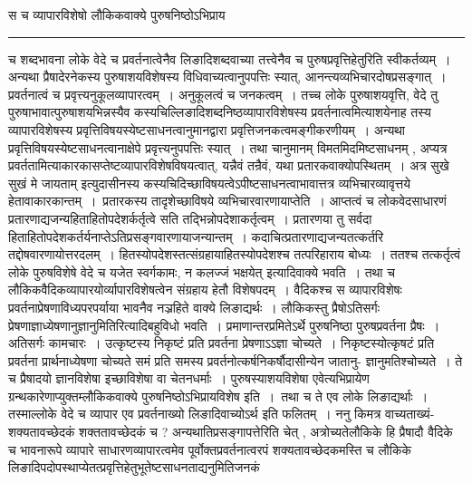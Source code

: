 \documentclass[11pt, openany]{book}
\begin{document}
{\bl स च व्यापारविशेषो लौकिकवाक्ये पुरुषनिष्ठोऽभिप्राय }\\
\hrule
\vspace{3mm}
\noindent
च शब्दभावना लोके वेदे च प्रवर्तनात्वेनैव लिङादिशब्दवाच्या तत्त्वेनैव च पुरुषप्रवृत्तिहेतुरिति स्वीकर्तव्यम्~। अन्यथा प्रैषादेरनेकस्य पुरुषाशयविशेषस्य विधिवाच्यत्वानुपपत्तिः स्यात्, आनन्त्यव्यभिचारदोषप्रसङ्गात्~। प्रवर्तनात्वं च प्रवृत्त्यनुकूलव्यापारत्वम्~। अनुकूलत्वं च जनकत्वम्~। तच्च लोके पुरुषाशयवृत्ति, वेदे तु पुरुषाभावात्पुरुषाशयभिन्नस्यैव कस्यचिल्लिङादिशब्दनिष्ठव्यापारविशेषस्य प्रवर्तनात्वमित्याशयेनाह  तस्य व्यापारविशेषस्य प्रवृत्तिविषयस्येष्टसाधनत्वानुमानद्वारा प्रवृत्तिजनकत्वमङ्गीकरणीयम्~। अन्यथा प्रवृत्तिविषयस्येष्टसाधनत्वानाक्षेपे प्रवृत्त्यनुपपत्तिः स्यात्~। तथा चानुमानम् {\qt विमतमिदमिष्टसाधनम् , अप्यत्र प्रवर्ततामित्याकारकासप्तेष्टव्यापारविशेषविषयत्वात्, यन्नैवं तन्रैवं, यथा प्रतारकवाक्योपस्थितम्~}। {\qt अत्र सुखे सुखं मे जायताम्} इत्युदासीनस्य कस्यचिदिच्छाविषयत्वेऽपीष्टसाधनत्वाभावात्तत्र व्यभिचारव्यावृत्तये हेतावाकारकान्तम्~।~प्रतारकस्य तादृशेच्छाविषये व्यभिचारवारणायाप्तेति~। आप्तत्वं च लोकवेदसाधारणं प्रतारणाद्यजन्यहिताहितोपदेशर्कर्तृत्वे सति तद्भिन्नोपदेशाकर्तृत्वम्~। प्रतारणया तु सर्वदा हिताहितोपदेशकर्तर्यनाप्तेऽतिप्रसङ्गवारणायाजन्यान्तम्~।
कदाचित्प्रतारणाद्यजन्यतत्कर्तरि तद्दोषवारणायोत्तरदलम्~। हितस्योपदेशस्तत्संग्रहायाहितस्योपदेशश्च तत्परिहाराय बोध्यः~। ततश्च तत्कर्तृत्वं लोके पुरुषविशेषे वेदे च {\qt यजेत स्वर्गकामः, न कलज्जं भक्षयेत्} इत्यादिवाक्ये भवति~। तथा च लौकिकवैदिकव्यापारयोर्व्यापारविशेषत्वेन संग्रहाय हेतौ विशेषपदम्~। वैदिकश्च स व्यापारविशेषः प्रवर्तनाप्रेषणाविध्यपरपर्याया भावनैव नञ्रहिते वाक्ये लिङाद्यर्थः~। लौकिकस्तु प्रैषोऽतिसर्गः प्रेषणाज्ञाध्येषणानुज्ञानुमितिरित्यादिबहुविधो भवति~। प्रमाणान्तरप्रमितेऽर्थे पुरुषनिष्ठा पुरुषप्रवर्तना प्रैषः~। अतिसर्गः कामचारः~। उत्कृष्टस्य निकृष्टं प्रति प्रवर्तना प्रेषणाऽऽज्ञा चोच्यते~। निकृष्टस्योत्कृषटं प्रति प्रवर्तना प्रार्थनाध्येषणा चोच्यते समं प्रति
समस्य प्रवर्तनोत्कर्षनिकर्षौदासीन्येन जातानु- \newpage
\fancyhead[LO]{वैदिकभेदौ ]}
\noindent
ज्ञानुमतिश्चोच्यते~। ते च प्रैषादयो ज्ञानविशेषा इच्छाविशेषा वा चेतनधर्माः~। पुरुषस्याशयविशेषा एवेत्यभिप्रायेण ग्रन्थकारेणाप्युक्तम्\textendash लौकिकवाक्ये पुरुषनिष्ठोऽभिप्रायविशेष इति~।~तथा च ते एव लोके लिङाद्यर्थाः~। तस्माल्लोके वेदे च व्यापार एव प्रवर्तनाख्यो लिङादिवाच्योऽर्थ इति फलितम्~। {\br ननु} किमत्र वाच्यताख्यं- शक्यतावच्छेदकं शक्ततावच्छेदकं च ? अन्यथातिप्रसङ्गापत्तेरिति चेत् , अत्रोच्यते\textendash लौकिके हि प्रैषादौ वैदिके च भावनारूपे व्यापारे साधारणव्यापारत्वमेव पूर्वोक्तप्रवर्तनात्वरपं शक्यतावच्छेदकमस्ति च लौकिके लिङादिप\footnotemark दोपस्थाप्येतत्प्रवृत्तिहेतुभूतेष्टसाधनताद्यनुमितिजनकं
\end{document}
